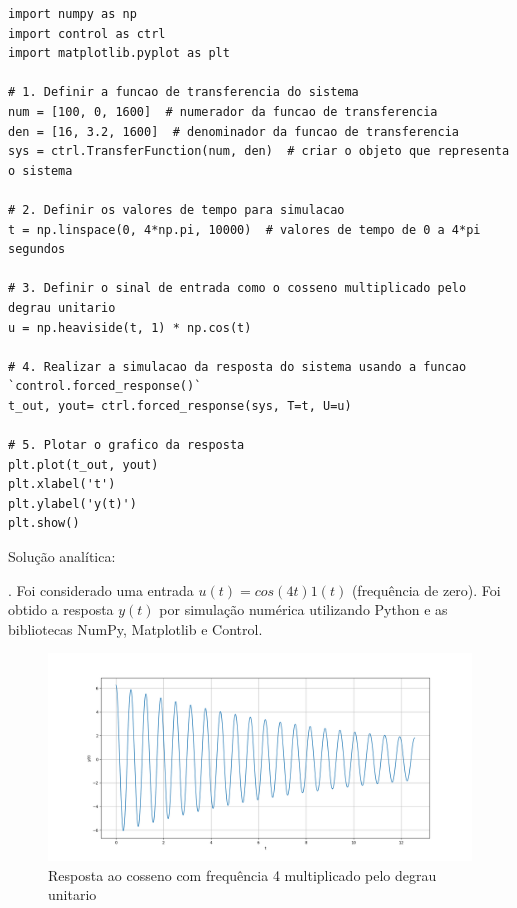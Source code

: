 \documentclass[10pt]{article}
\begin{document}
\begin{lstlisting}
import numpy as np
import control as ctrl
import matplotlib.pyplot as plt

# 1. Definir a funcao de transferencia do sistema
num = [100, 0, 1600]  # numerador da funcao de transferencia
den = [16, 3.2, 1600]  # denominador da funcao de transferencia
sys = ctrl.TransferFunction(num, den)  # criar o objeto que representa o sistema

# 2. Definir os valores de tempo para simulacao
t = np.linspace(0, 4*np.pi, 10000)  # valores de tempo de 0 a 4*pi segundos

# 3. Definir o sinal de entrada como o cosseno multiplicado pelo degrau unitario
u = np.heaviside(t, 1) * np.cos(t)

# 4. Realizar a simulacao da resposta do sistema usando a funcao `control.forced_response()`
t_out, yout= ctrl.forced_response(sys, T=t, U=u)

# 5. Plotar o grafico da resposta
plt.plot(t_out, yout)
plt.xlabel('t')
plt.ylabel('y(t)')
plt.show()
\end{lstlisting}

\quad Solução analítica:

\newpage

. Foi considerado uma entrada $u(t) = cos(4 t) 1(t)$ (frequência de zero). Foi obtido a resposta $y(t)$ por simulação numérica utilizando Python
e as bibliotecas NumPy, Matplotlib e Control.

\begin{figure}[h]
    \centering
    \includegraphics[scale=0.45]{questao2.png}
    \caption{Resposta ao cosseno com frequência 4 multiplicado pelo degrau unitario}
\end{figure}
\end{document}
